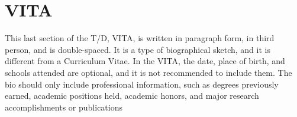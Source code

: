 \section*{\MakeUppercase{Vita}}


This last section of the T/D, VITA, is written in paragraph form, in third person, and is double-spaced. It is a type of biographical sketch, and it is different from a Curriculum Vitae. In the VITA, the date, place of birth, and schools attended are optional, and it is not recommended to include them. The bio should only include professional information, such as degrees previously earned, academic positions held, academic honors, and major research accomplishments or publications